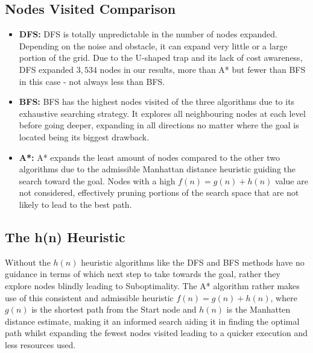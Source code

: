 \documentclass[12pt,a4paper]{article}
\begin{document}
\subsection{Nodes Visited Comparison}
\begin{itemize}
    \item \textbf{DFS:} DFS is totally unpredictable in the number of nodes 
    expanded. Depending on the noise and obstacle, it can 
    expand very little or a large portion of the grid. Due to the U-shaped trap 
    and its lack of cost awareness, DFS expanded $3{,}534$ nodes in our results, 
    more than A* but fewer than BFS in this case -  not always less than BFS.

    \item \textbf{BFS:} BFS has the highest nodes visited of the 
    three algorithms due to its exhaustive searching strategy. It explores all 
    neighbouring nodes at each level before going deeper, expanding in all 
    directions no matter where the goal is located being its biggest drawback.
    
    \item \textbf{A*:} A* expands the least amount of nodes compared to the other two 
    algorithms due to the admissible Manhattan distance heuristic guiding the 
    search toward the goal. Nodes with a high $f(n) = g(n) + h(n)$ value are 
    not considered, effectively pruning portions of the search space that 
    are not likely to lead to the best path.
\end{itemize}

\subsection{The h(n) Heuristic}
Without the $h(n)$ heuristic algorithms like the DFS and BFS methods have no guidance in terms of which next step to take towards the goal, rather they explore nodes
blindly leading to Suboptimality. The A* algorithm rather makes use of this consistent and admissible heuristic $f(n) = g(n) + h(n)$, where $g(n)$ is the shortest path from the Start node
and $h(n)$ is the Manhatten distance estimate, making it an informed search aiding it in finding the optimal path whilst expanding
the fewest nodes visited leading to a quicker execution and less resources used.
\end{document}
